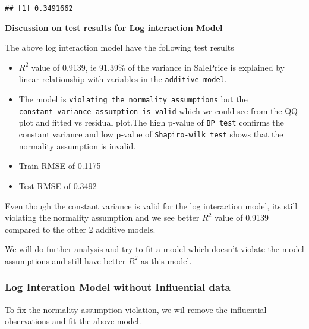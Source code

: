 \documentclass[]{article}
\begin{document}
\begin{verbatim}
## [1] 0.3491662
\end{verbatim}

\textbf{Discussion on test results for Log interaction Model}

The above log interaction model have the following test results

\begin{itemize}
\item
  \(R^2\) value of 0.9139, ie 91.39\% of the variance in SalePrice is
  explained by linear relationship with variables in the
  \texttt{additive\ model}.
\item
  The model is \texttt{violating\ the\ normality\ assumptions} but the
  \texttt{constant\ variance\ assumption\ is\ valid} which we could see
  from the QQ plot and fitted vs residual plot.The high p-value of
  \texttt{BP\ test} confirms the constant variance and low p-value of
  \texttt{Shapiro-wilk\ test} shows that the normality assumption is
  invalid.
\item
  Train RMSE of 0.1175
\item
  Test RMSE of 0.3492
\end{itemize}

Even though the constant variance is valid for the log interaction
model, its still violating the normality assumption and we see better
\(R^2\) value of 0.9139 compared to the other 2 additive models.

We will do further analysis and try to fit a model which doesn't violate
the model assumptions and still have better \(R^2\) as this model.

\subsubsection{Log Interation Model without Influential
data}\label{log-interation-model-without-influential-data}

To fix the normality assumption violation, we wil remove the influential
observations and fit the above model.
\end{document}
